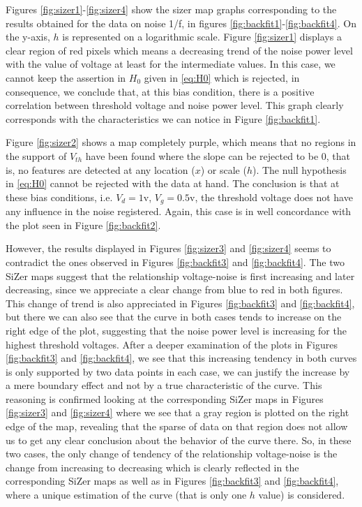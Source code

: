 \documentclass[sn-mathphys]{sn-jnl}%
\theoremstyle{thmstyleone}%
\theoremstyle{thmstyletwo}%
\theoremstyle{thmstylethree}%
\begin{document}
Figures \ref{fig:sizer1}-\ref{fig:sizer4} show the sizer map graphs corresponding to the results obtained for the data on noise 1/f, in figures \ref{fig:backfit1}-\ref{fig:backfit4}. On the y-axis, $h$ is represented on a logarithmic scale. Figure \ref{fig:sizer1} displays a clear region of red pixels which means a decreasing trend of the noise power level with the value of voltage at least for the intermediate values. In this case, we cannot keep the assertion in $H_0$ given in \eqref{eq:H0} which is rejected, in consequence, we conclude that, at this bias condition, there is a positive correlation between threshold voltage and noise power level. This graph clearly corresponds with the characteristics we can notice in Figure \ref{fig:backfit1}.

Figure \ref{fig:sizer2} shows a map completely purple, which means that no regions in the support of $V_{th}$ have been found where the slope can be rejected to be 0, that is, no features are detected at any location ($x$) or scale ($h$). The null hypothesis in \eqref{eq:H0} cannot be rejected with the data at hand. The conclusion is that at these bias conditions, i.e. $V_d=1$v, $V_g=0.5$v, the threshold voltage does not have any influence in the noise registered. Again, this case is in well concordance with the plot seen in Figure \ref{fig:backfit2}.

However, the results displayed in Figures  \ref{fig:sizer3} and \ref{fig:sizer4} seems to contradict the ones observed in Figures \ref{fig:backfit3} and \ref{fig:backfit4}. The two SiZer maps suggest that the relationship voltage-noise is first increasing and later decreasing, since we appreciate a clear change from blue to red in both figures. This change of trend is also appreciated in Figures \ref{fig:backfit3} and \ref{fig:backfit4}, but there we can also see that the curve in both cases tends to increase on the right edge of the plot, suggesting that the noise power level is increasing for the highest threshold voltages. After a deeper examination of the plots in Figures \ref{fig:backfit3} and \ref{fig:backfit4},  we see that this increasing tendency in both curves is only supported by two data points in each case, we can justify the increase by a mere boundary effect and not by a true characteristic of the curve. This reasoning is confirmed looking at the corresponding SiZer maps in  Figures  \ref{fig:sizer3} and \ref{fig:sizer4} where we see that a gray region is plotted on the right edge of the map, revealing that the sparse of data on that region does not allow us to get any clear conclusion about the behavior of the curve there. So, in these two cases, the only change of tendency of the relationship voltage-noise is the change from  increasing to decreasing which is clearly reflected in the corresponding SiZer maps as well as in Figures \ref{fig:backfit3} and \ref{fig:backfit4}, where a unique estimation of the curve (that is only one $h$ value) is considered.
\end{document}
